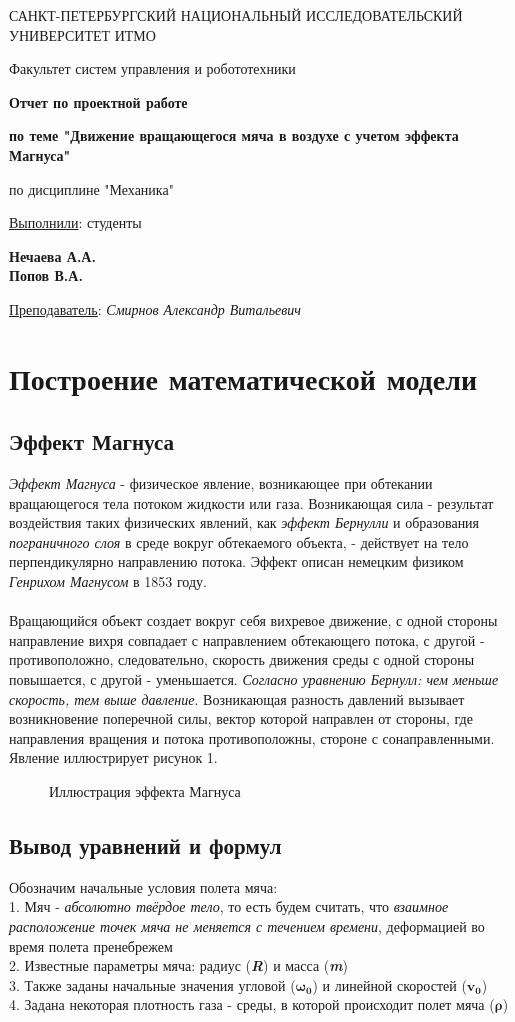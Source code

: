 \documentclass[a5paper, 10pt]{article}
\theoremstyle{definition}
\theoremstyle{plain}
\theoremstyle{remark}
\newcommand*{\titlePage}{
	\thispagestyle{title}
	\begingroup
	\begin{center}
		\vspace*{6ex}
		
		{\small
			САНКТ-ПЕТЕРБУРГСКИЙ НАЦИОНАЛЬНЫЙ ИССЛЕДОВАТЕЛЬСКИЙ УНИВЕРСИТЕТ ИТМО	
		}
		
		\vspace*{2ex}
		
		{\normalsize
			Факультет систем управления и робототехники
		}
		
		\vspace*{15ex}
		
		{\Large \bfseries 
			Отчет по проектной работе
		}
\vspace*{2ex}
		
		{\Large \bfseries 
			по теме "Движение вращающегося мяча в воздухе с учетом эффекта Магнуса"
		}
\vspace*{2ex}
		
		{\Large
			по дисциплине "Механика"
		}

	\end{center}
	\vspace*{20ex}
	\begin{flushright}
		{\large 
			\underline{Выполнили}: студенты\\
			\begin{flushright}
				\textbf{Нечаева А.А.}\\
                                \textbf{Попов В.А.}\\
			\end{flushright}
		}
		
		\vspace*{5ex}
		
		{\large 
			\underline{Преподаватель}: \textit{Смирнов Александр Витальевич}
		}
	\end{flushright}	
	\newpage
	\setcounter{page}{2}
	\endgroup}
\begin{document}
	\titlePage
	\pagestyle{style}
\newpage
\section{Построение математической модели}
\subsection{Эффект Магнуса}
\textit{Эффект Магнуса} - физическое явление, возникающее при обтекании вращающегося тела потоком жидкости или газа. Возникающая сила - результат воздействия таких физических явлений, как \textit{эффект Бернулли} и образования \textit{пограничного слоя} в среде вокруг обтекаемого объекта, - действует на тело перпендикулярно направлению потока. Эффект описан немецким физиком \textit{Генрихом Магнусом} в 1853 году. \\\\
Вращающийся объект создает вокруг себя вихревое движение, с одной стороны направление вихря совпадает с направлением обтекающего потока, с другой - противоположно, следовательно, скорость движения среды с одной стороны повышается, с другой - уменьшается. \textit{Согласно уравнению Бернулл: чем меньше скорость, тем выше давление}. Возникающая разность давлений вызывает возникновение поперечной силы, вектор которой направлен от стороны, где направления вращения и потока противоположны, стороне с сонаправленными. Явление иллюстрирует рисунок 1.
\begin{figure}[h]
	           \caption{Иллюстрация эффекта Магнуса}
\end{figure}

\subsection{Вывод уравнений и формул}	
Обозначим начальные условия полета мяча:\\
1. Мяч - \textit{абсолютно твёрдое тело}, то есть будем считать, что \textit{взаимное расположение точек мяча не меняется с течением времени}, деформацией во время полета пренебрежем\\
2. Известные параметры мяча: радиус (\textit{\textbf{R}}) и масса (\textit{\textbf{m}})\\
3. Также заданы начальные значения угловой ($\mathbf{\omega_{0}}$) и линейной скоростей ($\mathbf{v_{0}}$)\\
4. Задана некоторая плотность газа - среды, в которой происходит полет мяча ($\mathbf{\rho}$)\\\\
\end{document}
